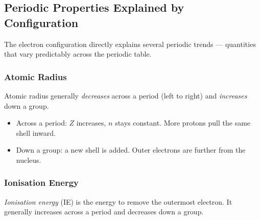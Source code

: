 \documentclass[12pt, a4paper]{book}
\newcommand{\newterm}[1]{\textit{\textcolor{DiscoveryColor}{#1}}}
\begin{document}
\subsection{Periodic Properties Explained by Configuration}

The electron configuration directly explains several
periodic trends --- quantities that vary predictably
across the periodic table.

\subsubsection{Atomic Radius}

Atomic radius generally \emph{decreases} across a period
(left to right) and \emph{increases} down a group.

\begin{itemize}[nosep, leftmargin=2em]
  \item Across a period: $Z$ increases, $n$ stays constant.
        More protons pull the same shell inward.
  \item Down a group: a new shell is added.
        Outer electrons are further from the nucleus.
\end{itemize}

\subsubsection{Ionisation Energy}

\newterm{Ionisation energy} (IE) is the energy to remove
the outermost electron.
It generally increases across a period and decreases down a group.
\end{document}
